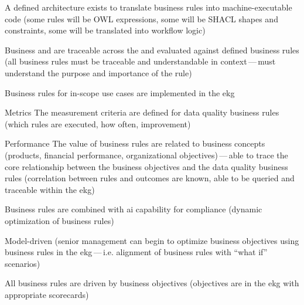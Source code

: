 \ekgmmscoringlevelTwo

\begin{scoring}

  \item A defined architecture exists to translate business rules into machine-executable code (some rules will be
        OWL expressions, some will be SHACL shapes and constraints, some will be translated into
        workflow logic)
  \item Business  and  are traceable across the  and
        evaluated against defined business rules (all business rules must be traceable and understandable in
        context\,---\,must understand the purpose and importance of the rule)
  \item Business rules for in-scope use cases are implemented in the \gls{ekg}

\end{scoring}

\ekgmmscoringlevelThree

\begin{scoring}

    \item [Metrics] The measurement criteria are defined for data quality business rules (which rules are executed,
          how often, improvement)
    \item [Performance] The value of business rules are related to business concepts (products, financial performance,
          organizational objectives)\,---\,able to trace the core relationship between the business objectives and
          the data quality business rules (correlation between rules and outcomes are known, able to be queried and
          traceable within the \gls{ekg})

\end{scoring}

\ekgmmscoringlevelFour

\begin{scoring}

    \item Business rules are combined with \gls{ai} capability for compliance (dynamic optimization of
          business rules)
    \item Model-driven (senior management can begin to optimize business objectives using business rules in
          the \gls{ekg}\,---\,i.e. alignment of business rules with “what if” scenarios)

\end{scoring}

\ekgmmscoringlevelFive

\begin{scoring}

    \item All business rules are driven by business objectives (objectives are in the \gls{ekg} with appropriate scorecards)

\end{scoring}
